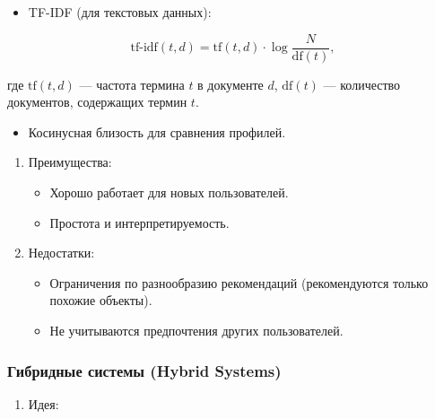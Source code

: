 \begin{enumerate}
\begin{enumerate}
  \begin{itemize}
  \tightlist
  \item
    TF-IDF (для текстовых данных):
  \end{itemize}
\end{enumerate}

\begin{equation}
     \text{tf-idf}(t, d) = \text{tf}(t, d) \cdot \log\frac{N}{\text{df}(t)},
\end{equation}


 где \( \text{tf}(t, d) \) — частота термина \( t \) в документе \( d \), \( \text{df}(t) \) — количество документов, содержащих термин \( t \).


\begin{itemize}
\tightlist
\item
  Косинусная близость для сравнения профилей.
\end{itemize}

\begin{enumerate}
\def\labelenumi{\arabic{enumi}.}
\setcounter{enumi}{3}
\tightlist
\item
  Преимущества:

  \begin{itemize}
  \tightlist
  \item
    Хорошо работает для новых пользователей.
  \item
    Простота и интерпретируемость.
  \end{itemize}
\item
  Недостатки:

  \begin{itemize}
  \tightlist
  \item
    Ограничения по разнообразию рекомендаций (рекомендуются только
    похожие объекты).
  \item
    Не учитываются предпочтения других пользователей.
  \end{itemize}
\end{enumerate}

\hypertarget{ux433ux438ux431ux440ux438ux434ux43dux44bux435-ux441ux438ux441ux442ux435ux43cux44b-hybrid-systems}{%
\subsubsection*{Гибридные системы (Hybrid
Systems)}\label{ux433ux438ux431ux440ux438ux434ux43dux44bux435-ux441ux438ux441ux442ux435ux43cux44b-hybrid-systems}}

\begin{enumerate}
\def\labelenumi{\arabic{enumi}.}
\tightlist
\item
  Идея:


\end{enumerate}
\end{enumerate}
